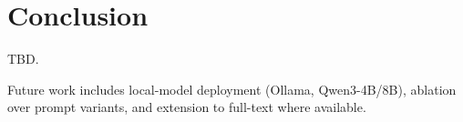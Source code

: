 \section{Conclusion}

TBD.

Future work includes local-model deployment (Ollama, Qwen3-4B/8B), ablation over prompt variants, and extension to full-text where available.
